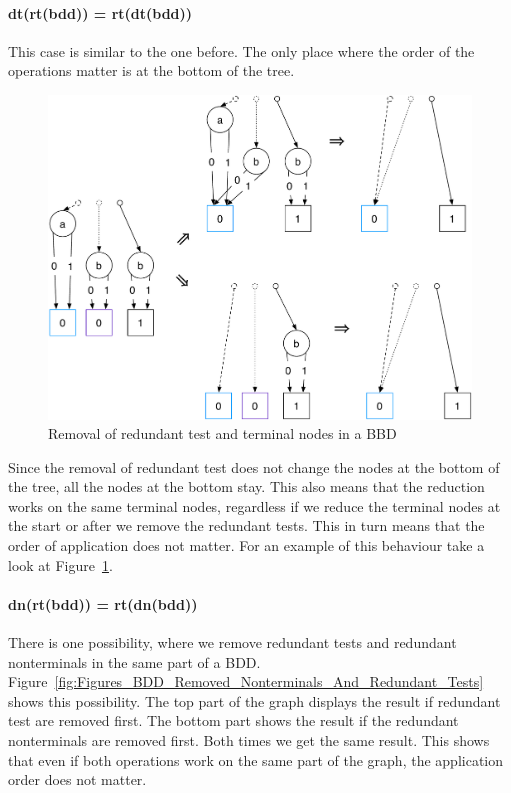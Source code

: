 \documentclass[a4paper, 11pt]{article}
\begin{document}
\paragraph{dt(rt(bdd)) = rt(dt(bdd))}

This case is similar to the one before. The only place where the order of the operations matter is at the bottom of the tree.

\begin{figure}[h]
  \centering
    \includegraphics[width=.75\textwidth]{Figures/BDD Removed Terminals And Redundant Tests.pdf}
  \caption{Removal of redundant test and terminal nodes in a BBD}
  \label{fig:Figures_BDD_Removed_Terminals_And_Redundant_Tests}
\end{figure}

Since the removal of redundant test does not change the nodes at the bottom of the tree, all the nodes at the bottom stay. This also means that the reduction works on the same terminal nodes, regardless if we reduce the terminal nodes at the start or after we remove the redundant tests. This in turn means that the order of application does not matter. For an example of this behaviour take a look at Figure~\ref{fig:Figures_BDD_Removed_Terminals_And_Redundant_Tests}.

\paragraph{dn(rt(bdd)) = rt(dn(bdd))}

There is one possibility, where we remove redundant tests and redundant nonterminals in the same part of a BDD. Figure~\ref{fig:Figures_BDD_Removed_Nonterminals_And_Redundant_Tests} shows this possibility. The top part of the graph displays the result if redundant test are removed first. The bottom part shows the result if the redundant nonterminals are removed first. Both times we get the same result. This shows that even if both operations work on the same part of the graph, the application order does not matter.
\end{document}
